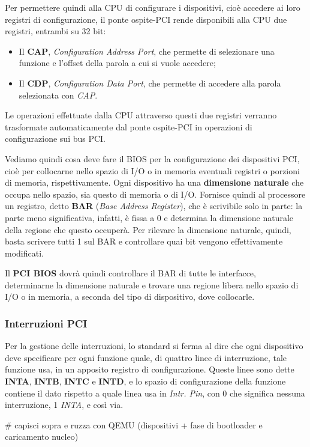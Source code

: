\documentclass[a4paper,11pt]{article}
\begin{document}
Per permettere quindi alla CPU di configurare i dispositivi, cioè accedere ai loro registri di configurazione, il ponte ospite-PCI rende disponibili alla CPU due registri, entrambi su 32 bit:
\begin{itemize}
	\item Il \textbf{CAP}, \textit{Configuration Address Port}, che permette di selezionare una funzione e l'offset della parola a cui si vuole accedere;
	\item Il \textbf{CDP}, \textit{Configuration Data Port}, che permette di accedere alla parola selezionata con \textit{CAP}.
\end{itemize}
Le operazioni effettuate dalla CPU attraverso questi due registri verranno trasformate automaticamente dal ponte ospite-PCI in operazioni di configurazione sui bus PCI.

Vediamo quindi cosa deve fare il BIOS per la configurazione dei dispositivi PCI, cioè per collocarne nello spazio di I/O o in memoria eventuali registri o porzioni di memoria, rispettivamente.
Ogni dispositivo ha una \textbf{dimensione naturale} che occupa nello spazio, sia questo di memoria o di I/O.
Fornisce quindi al processore un registro, detto \textbf{BAR} (\textit{Base Address Register}), che è scrivibile solo in parte: la parte meno significativa, infatti, è fissa a 0 e determina la dimensione naturale della regione che questo occuperà.
Per rilevare la dimensione naturale, quindi, basta scrivere tutti 1 sul BAR e controllare quai bit vengono effettivamente modificati.

Il \textbf{PCI BIOS} dovrà quindi controllare il BAR di tutte le interfacce, determinarne la dimensione naturale e trovare una regione libera nello spazio di I/O o in memoria, a seconda del tipo di dispositivo, dove collocarle.

\subsubsection{Interruzioni PCI}
Per la gestione delle interruzioni, lo standard si ferma al dire che ogni dispositivo deve specificare per ogni funzione quale, di quattro linee di interruzione, tale funzione usa, in un apposito registro di configurazione.
Queste linee sono dette \textbf{INTA}, \textbf{INTB}, \textbf{INTC} e \textbf{INTD}, e lo spazio di configurazione della funzione contiene il dato rispetto a quale linea usa in \textit{Intr. Pin}, con 0 che significa nessuna interruzione, 1 \textit{INTA}, e così via.

# capisci sopra e ruzza con QEMU (dispositivi + fase di bootloader e caricamento nucleo)
\end{document}
